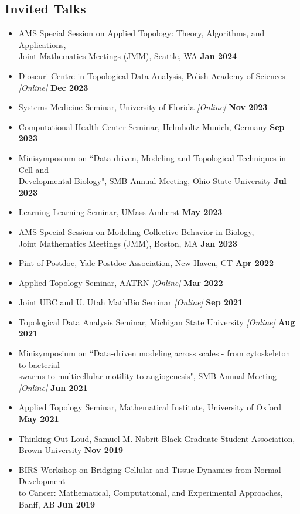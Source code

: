 \documentclass[margin,line]{res}
\begin{document}
\begin{resume}
\section{\sc Invited Talks}
{\renewcommand\leftmargini{0em}
\begin{itemize}
\setlength\itemsep{0.3em}
\item[] AMS Special Session on Applied Topology: Theory, Algorithms, and Applications,\\Joint Mathematics Meetings (JMM), Seattle, WA \hfill {\bf Jan 2024} 
\item[] Dioscuri Centre in Topological Data Analysis, Polish Academy of Sciences \textit{[Online]} \hfill {\bf Dec 2023}
\item[] Systems Medicine Seminar, University of Florida \textit{[Online]} \hfill {\bf Nov 2023}
\item[] Computational Health Center Seminar, Helmholtz Munich, Germany \hfill {\bf Sep 2023}
\item[] Minisymposium on ``Data-driven, Modeling and Topological Techniques in Cell and \\Developmental Biology", SMB Annual Meeting, Ohio State University \hfill {\bf Jul 2023}
\item[] Learning Learning Seminar, UMass Amherst \hfill {\bf May 2023}
\item[] AMS Special Session on Modeling Collective Behavior in Biology,\\Joint Mathematics Meetings (JMM), Boston, MA \hfill {\bf Jan 2023}
\item[] Pint of Postdoc, Yale Postdoc Association, New Haven, CT \hfill {\bf Apr 2022}
\item[] Applied Topology Seminar, AATRN \textit{[Online]} \hfill {\bf Mar 2022}
\item[] Joint UBC and U. Utah MathBio Seminar \textit{[Online]} \hfill {\bf Sep 2021}
\item[] Topological Data Analysis Seminar, Michigan State University \textit{[Online]} \hfill {\bf Aug 2021}
\item[] Minisymposium on ``Data-driven modeling across scales - from cytoskeleton to bacterial \\swarms to multicellular motility to angiogenesis", SMB Annual Meeting \textit{[Online]} \hfill {\bf Jun 2021}
\item[] Applied Topology Seminar, Mathematical Institute, University of Oxford \hfill {\bf May 2021}
\item[] Thinking Out Loud, Samuel M. Nabrit Black Graduate Student Association, \\ Brown University \hfill {\bf Nov 2019}
\item[] BIRS Workshop on Bridging Cellular and Tissue Dynamics from Normal Development \\ to Cancer: Mathematical, Computational, and Experimental Approaches, Banff, AB \hfill {\bf Jun 2019} 
\end{itemize}
}


\end{resume}
\end{document}
